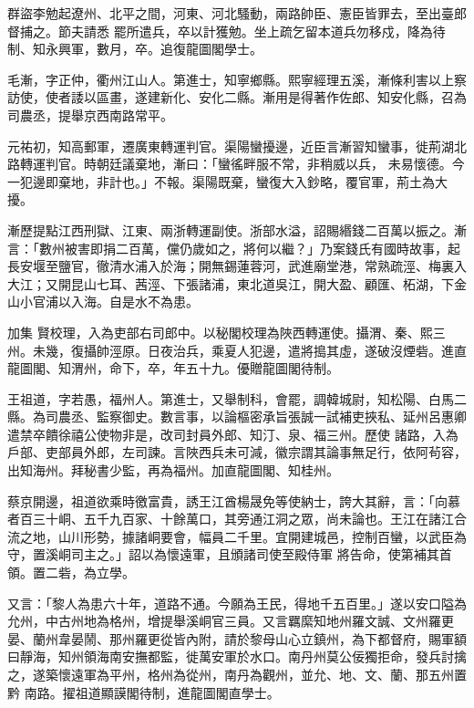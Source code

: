 \begin{pinyinscope}
 群盜李勉起遼州、北平之間，河東、河北騷動，兩路帥臣、憲臣皆罪去，至出臺郎督捕之。節夫請悉
 罷所遣兵，卒以計獲勉。坐上疏乞留本道兵勿移戍，降為待制、知永興軍，數月，卒。追復龍圖閣學士。



 毛漸，字正仲，衢州江山人。第進士，知寧鄉縣。熙寧經理五溪，漸條利害以上察訪使，使者諉以區畫，遂建新化、安化二縣。漸用是得著作佐郎、知安化縣，召為司農丞，提舉京西南路常平。



 元祐初，知高郵軍，遷廣東轉運判官。渠陽蠻擾邊，近臣言漸習知蠻事，徙荊湖北路轉運判官。時朝廷議棄地，漸曰：「蠻徭畔服不常，非稍威以兵，
 未易懷德。今一犯邊即棄地，非計也。」不報。渠陽既棄，蠻復大入鈔略，覆官軍，荊土為大擾。



 漸歷提點江西刑獄、江東、兩浙轉運副使。浙部水溢，詔賜緡錢二百萬以振之。漸言：「數州被害即捐二百萬，儻仍歲如之，將何以繼？」乃案錢氏有國時故事，起長安堰至鹽官，徹清水浦入於海；開無錫蓮蓉河，武進廟堂港，常熟疏涇、梅裏入大江；又開昆山七耳、茜涇、下張諸浦，東北道吳江，開大盈、顧匯、柘湖，下金山小官浦以入海。自是水不為患。



 加集
 賢校理，入為吏部右司郎中。以秘閣校理為陜西轉運使。攝渭、秦、熙三州。未幾，復攝帥涇原。日夜治兵，乘夏人犯邊，遣將搗其虛，遂破沒煙砦。進直龍圖閣、知渭州，命下，卒，年五十九。優贈龍圖閣待制。



 王祖道，字若愚，福州人。第進士，又舉制科，會罷，調韓城尉，知松陽、白馬二縣。為司農丞、監察御史。數言事，以論樞密承旨張誠一試補吏挾私、延州呂惠卿遣禁卒饋徐禧公使物非是，改司封員外郎、知汀、泉、福三州。歷使
 諸路，入為戶部、吏部員外郎，左司諫。言陜西兵未可減，徽宗謂其論事無足行，依阿茍容，出知海州。拜秘書少監，再為福州。加直龍圖閣、知桂州。



 蔡京開邊，祖道欲乘時徼富貴，誘王江酋楊晟免等使納士，誇大其辭，言：「向慕者百三十峒、五千九百家、十餘萬口，其旁通江洞之眾，尚未論也。王江在諸江合流之地，山川形勢，據諸峒要會，幅員二千里。宜開建城邑，控制百蠻，以武臣為守，置溪峒司主之。」詔以為懷遠軍，且頒諸司使至殿侍軍
 將告命，使第補其首領。置二砦，為立學。



 又言：「黎人為患六十年，道路不通。今願為王民，得地千五百里。」遂以安口隘為允州，中古州地為格州，增提舉溪峒官三員。又言羈縻知地州羅文誠、文州羅更晏、蘭州韋晏鬧、那州羅更從皆內附，請於黎母山心立鎮州，為下都督府，賜軍額曰靜海，知州領海南安撫都監，徙萬安軍於水口。南丹州莫公佞獨拒命，發兵討擒之，遂築懷遠軍為平州，格州為從州，南丹為觀州，並允、地、文、蘭、那五州置黔
 南路。擢祖道顯謨閣待制，進龍圖閣直學士。




\end{pinyinscope}
